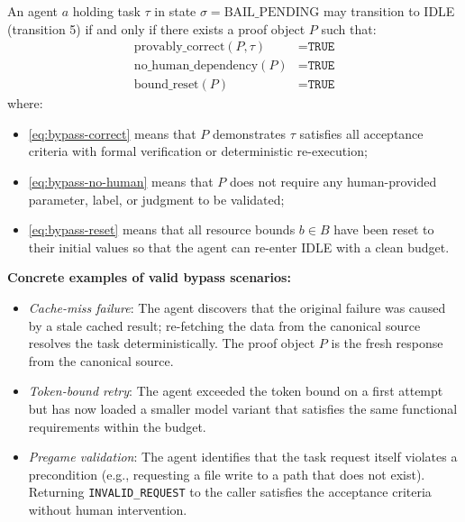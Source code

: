 \begin{definition}\label{def:bypass-predicate}
An agent $a$ holding task $\tau$ in state $\sigma = \text{BAIL\_PENDING}$
may transition to IDLE (transition 5) if and only if there exists a
proof object $P$ such that:
\begin{align}
  \text{provably\_correct}(P, \tau) &= \texttt{TRUE} \label{eq:bypass-correct}\\
  \text{no\_human\_dependency}(P)   &= \texttt{TRUE} \label{eq:bypass-no-human}\\
  \text{bound\_reset}(P)            &= \texttt{TRUE} \label{eq:bypass-reset}
\end{align}
where:
\begin{itemize}
  \item \eqref{eq:bypass-correct} means that $P$ demonstrates $\tau$ satisfies
        all acceptance criteria with formal verification or
        deterministic re-execution;
  \item \eqref{eq:bypass-no-human} means that $P$ does not require any
        human-provided parameter, label, or judgment to be validated;
  \item \eqref{eq:bypass-reset} means that all resource bounds $b \in B$
        have been reset to their initial values so that the agent can
        re-enter IDLE with a clean budget.
\end{itemize}
\end{definition}

\bigskip
\noindent\textbf{Concrete examples of valid bypass scenarios:}

\begin{itemize}
  \item \emph{Cache-miss failure}: The agent discovers that the original
        failure was caused by a stale cached result; re-fetching the data
        from the canonical source resolves the task deterministically.
        The proof object $P$ is the fresh response from the canonical source.

  \item \emph{Token-bound retry}: The agent exceeded the token bound on a
        first attempt but has now loaded a smaller model variant that
        satisfies the same functional requirements within the budget.

  \item \emph{Pregame validation}: The agent identifies that the task
        request itself violates a precondition (e.g., requesting a file
        write to a path that does not exist).  Returning
        \texttt{INVALID\_REQUEST} to the caller satisfies the acceptance
        criteria without human intervention.
\end{itemize}

